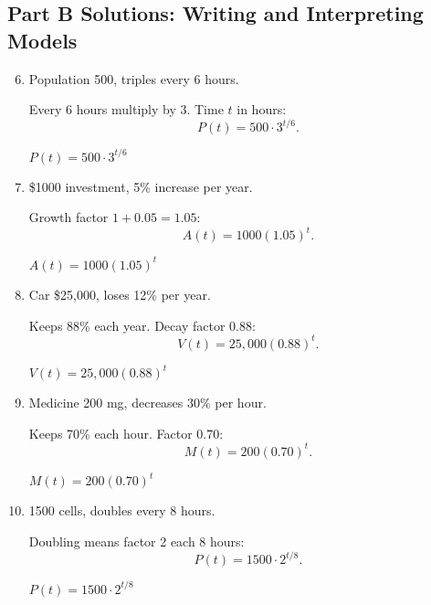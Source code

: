 \documentclass[12pt]{article}
\begin{document}
\subsection*{Part B Solutions: Writing and Interpreting Models}
\begin{enumerate}
  \setcounter{enumi}{5}
  \item Population 500, triples every 6 hours.

  Every 6 hours multiply by 3. Time \(t\) in hours:
  \[
  P(t) = 500 \cdot 3^{t/6}.
  \]

  \(\boxed{P(t) = 500 \cdot 3^{t/6}}\)

  \item \$1000 investment, 5\% increase per year.

  Growth factor \(1 + 0.05 = 1.05\):
  \[
  A(t) = 1000(1.05)^t.
  \]

  \(\boxed{A(t) = 1000(1.05)^t}\)

  \item Car \$25{,}000, loses 12\% per year.

  Keeps 88\% each year. Decay factor \(0.88\):
  \[
  V(t) = 25{,}000(0.88)^t.
  \]

  \(\boxed{V(t) = 25{,}000(0.88)^t}\)

  \item Medicine 200 mg, decreases 30\% per hour.

  Keeps 70\% each hour. Factor \(0.70\):
  \[
  M(t) = 200(0.70)^t.
  \]

  \(\boxed{M(t) = 200(0.70)^t}\)

  \item 1500 cells, doubles every 8 hours.

  Doubling means factor 2 each 8 hours:
  \[
  P(t) = 1500 \cdot 2^{t/8}.
  \]

  \(\boxed{P(t) = 1500 \cdot 2^{t/8}}\)
\end{enumerate}
\end{document}
